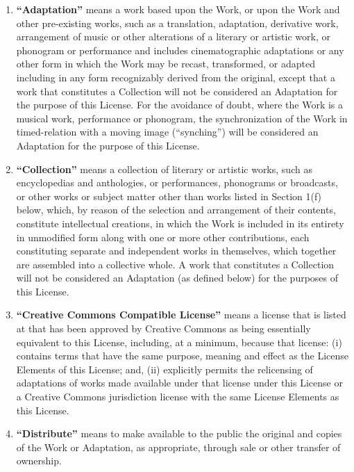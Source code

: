 \begin{enumerate}
\item \textbf{``Adaptation''} means a work based upon
  the Work, or upon the Work and other pre-existing works,
  such as a translation, adaptation, derivative work,
  arrangement of music or other alterations of a literary
  or artistic work, or phonogram or performance and
  includes cinematographic adaptations or any other form in
  which the Work may be recast, transformed, or adapted
  including in any form recognizably derived from the
  original, except that a work that constitutes a
  Collection will not be considered an Adaptation for the
  purpose of this License. For the avoidance of doubt,
  where the Work is a musical work, performance or
  phonogram, the synchronization of the Work in
  timed-relation with a moving image (``synching'') will be
  considered an Adaptation for the purpose of this
  License.

\item \textbf{``Collection''} means a collection of
  literary or artistic works, such as encyclopedias and
  anthologies, or performances, phonograms or broadcasts,
  or other works or subject matter other than works listed
  in Section 1(f) below, which, by reason of the selection
  and arrangement of their contents, constitute
  intellectual creations, in which the Work is included in
  its entirety in unmodified form along with one or more
  other contributions, each constituting separate and
  independent works in themselves, which together are
  assembled into a collective whole. A work that
  constitutes a Collection will not be considered an
  Adaptation (as defined below) for the purposes of this
  License.

\item \textbf{``Creative Commons Compatible
  License''} means a license that is listed at
   that has
  been approved by Creative Commons as being essentially
  equivalent to this License, including, at a minimum,
  because that license: (i) contains terms that have the
  same purpose, meaning and effect as the License Elements
  of this License; and, (ii) explicitly permits the
  relicensing of adaptations of works made available under
  that license under this License or a Creative Commons
  jurisdiction license with the same License Elements as
  this License.

\item \textbf{``Distribute''} means to make available
  to the public the original and copies of the Work or
  Adaptation, as appropriate, through sale or other
  transfer of ownership.


\end{enumerate}
